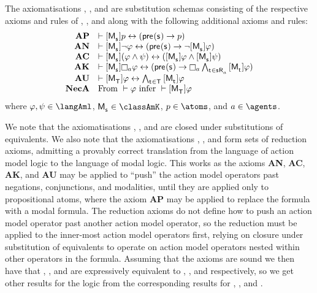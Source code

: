 \begin{definition}
The axiomatisations \axiomAmlK{}, \axiomAmlKFF{}, and \axiomAmlS{} are substitution schemas consisting of the respective axioms and rules of \axiomK{}, \axiomKFF{}, and \axiomS{} along with the following additional axioms and rules:
$$
\begin{array}{rl}
    {\bf AP} & \proves \actionA{\aPModel{\aStateS}} \atomP \iff (\aPrecondition(\aStateS) \implies \atomP)\\
    {\bf AN} & \proves \actionA{\aPModel{\aStateS}} \lnot \phi \iff (\aPrecondition(\aStateS) \implies \lnot \actionA{\aPModel{\aStateS}} \phi)\\
    {\bf AC} & \proves \actionA{\aPModel{\aStateS}} (\phi \land \psi) \iff (\actionA{\aPModel{\aStateS}} \phi \land \actionA{\aPModel{\aStateS}} \psi)\\
    {\bf AK} & \proves \actionA{\aPModel{\aStateS}} \necessaryA \phi \iff (\aPrecondition(\aStateS) \implies \necessaryA \bigwedge_{\aStateT \in \aSuccessorsA{\aStateS}} \actionA{\aPModel{\aStateT}} \phi)\\
    {\bf AU} & \proves \actionA{\aPModel{\aStatesT}} \phi \iff \bigwedge_{\aStateT \in \aStatesT} \actionA{\aPModel{\aStateT}} \phi\\
    {\bf NecA} & \text{From } \proves \phi \text{ infer } \proves \actionA{\aPModel{\aStatesT}} \phi
\end{array}
$$
where $\phi, \psi \in \langAml$, $\aPModel{\aStateS} \in \classAmK$, $\atomP \in \atoms$, and $\agentA \in \agents$.
\end{definition}

We note that the axiomatisations \axiomAmlK{}, \axiomAmlKFF{}, and \axiomAmlS{} are closed under substitutions of equivalents.
We also note that the axiomatisations \axiomAmlK{}, \axiomAmlKFF{}, and \axiomAmlS{} form sets of reduction axioms, admitting a provably correct translation from the language \langAml{} of action model logic to the language \langMl{} of modal logic.
This works as the axioms {\bf AN}, {\bf AC}, {\bf AK}, and {\bf AU} may be applied to ``push'' the action model operators past negations, conjunctions, and modalities, until they are applied only to propositional atoms, where the axiom {\bf AP} may be applied to replace the formula with a modal formula.
The reduction axioms do not define how to push an action model operator past another action model operator, so the reduction must be applied to the inner-most action model operators first, relying on closure under substitution of equivalents to operate on action model operators nested within other operators in the formula.
Assuming that the axioms are sound we then have that \logicAmlK{}, \logicAmlKFF{}, and \logicAmlS{} are expressively equivalent to \logicK{}, \logicKFF{}, and \logicS{} respectively, so we get other results for the logic from the corresponding results for \logicK{}, \logicKFF{}, and \logicS{}.

